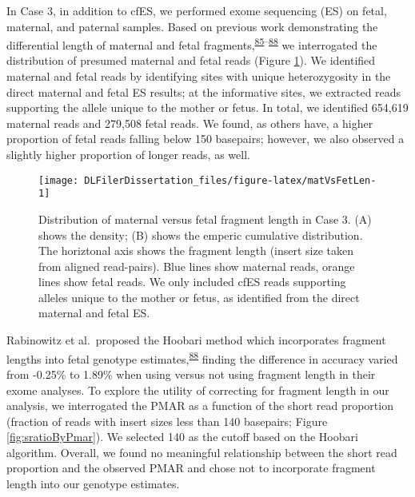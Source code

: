 \documentclass[11pt,letterpaper]{book}
\begin{document}
In Case 3, in addition to cfES, we performed exome sequencing (ES) on fetal, maternal, and paternal samples.
Based on previous work demonstrating the differential length of maternal and fetal fragments,\textsuperscript{\protect\hyperlink{ref-chan:2004aa}{85}--\protect\hyperlink{ref-rabinowitz:2019aa}{88}} we interrogated the distribution of presumed maternal and fetal reads (Figure \ref{fig:matVsFetLen}).
We identified maternal and fetal reads by identifying sites with unique heterozygosity in the direct maternal and fetal ES results; at the informative sites, we extracted reads supporting the allele unique to the mother or fetus.
In total, we identified 654,619 maternal reads and 279,508 fetal reads.
We found, as others have, a higher proportion of fetal reads falling below 150 basepairs; however, we also observed a slightly higher proportion of longer reads, as well.





\begin{figure}

{\centering \texttt{[image: DLFilerDissertation\_files/figure-latex/matVsFetLen-1]} 

}

\caption[Distribution of maternal versus fetal fragment length in Case 3.]{Distribution of maternal versus fetal fragment length in Case 3. (A) shows the density; (B) shows the emperic cumulative distribution. The horiztonal axis shows the fragment length (insert size taken from aligned read-pairs). Blue lines show maternal reads, orange lines show fetal reads. We only included cfES reads supporting alleles unique to the mother or fetus, as identified from the direct maternal and fetal ES.}\label{fig:matVsFetLen}
\end{figure}

Rabinowitz et al.~proposed the Hoobari method which incorporates fragment lengths into fetal genotype estimates,\textsuperscript{\protect\hyperlink{ref-rabinowitz:2019aa}{88}} finding the difference in accuracy varied from -0.25\% to 1.89\% when using versus not using fragment length in their exome analyses.
To explore the utility of correcting for fragment length in our analysis, we interrogated the PMAR as a function of the short read proportion (fraction of reads with insert sizes less than 140 basepairs; Figure \ref{fig:sratioByPmar}).
We selected 140 as the cutoff based on the Hoobari algorithm.
Overall, we found no meaningful relationship between the short read proportion and the observed PMAR and chose not to incorporate fragment length into our genotype estimates.
\end{document}
